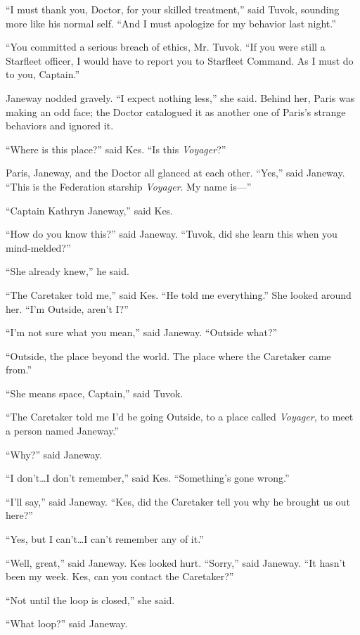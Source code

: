 \documentclass[twoside,letterpaper,12pt]{memoir}
\begin{document}
``I must thank you, Doctor, for your skilled treatment,'' said Tuvok, sounding more like his normal self. ``And I must apologize for my behavior last night.'' 

``You committed a serious breach of ethics, Mr. Tuvok. ``If you were still a Starfleet officer, I would have to report you to Starfleet Command. As I must do to you, Captain.'' 

Janeway nodded gravely. ``I expect nothing less,'' she said. Behind her, Paris was making an odd face; the Doctor catalogued it as another one of Paris's strange behaviors and ignored it. 

``Where is this place?'' said Kes. ``Is this \textit{Voyager}?'' 

Paris, Janeway, and the Doctor all glanced at each other. ``Yes,'' said Janeway. ``This is the Federation starship \textit{Voyager}. My name is---'' 

``Captain Kathryn Janeway,'' said Kes. 

``How do you know this?'' said Janeway. ``Tuvok, did she learn this when you mind-melded?'' 

``She already knew,'' he said. 

``The Caretaker told me,'' said Kes. ``He told me everything.'' She looked around her. ``I’m Outside, aren’t I?'' 

``I’m not sure what you mean,'' said Janeway. ``Outside what?'' 

``Outside, the place beyond the world. The place where the Caretaker came from.'' 

``She means space, Captain,'' said Tuvok. 

``The Caretaker told me I’d be going Outside, to a place called \textit{Voyager, }to meet a person named Janeway.'' 

``Why?'' said Janeway. 

``I don’t\ldots I don’t remember,'' said Kes. ``Something’s gone wrong.'' 

``I’ll say,'' said Janeway. ``Kes, did the Caretaker tell you why he brought us out here?'' 

``Yes, but I can’t\ldots I can’t remember any of it.'' 

``Well, great,'' said Janeway. Kes looked hurt. ``Sorry,'' said Janeway. ``It hasn’t been my week. Kes, can you contact the Caretaker?'' 

``Not until the loop is closed,'' she said. 

``What loop?'' said Janeway. 
\end{document}
